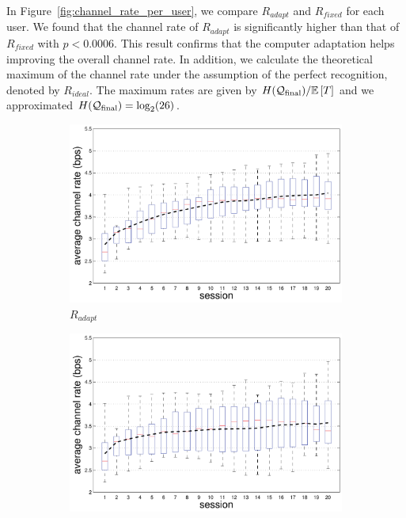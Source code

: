 \documentclass{sigchi}
\begin{document}
In Figure~\ref{fig:channel_rate_per_user}, we compare $R_{adapt}$ and
$R_{fixed}$ for each user. We found that the channel rate of
$R_{adapt}$ is significantly higher than that of $R_{fixed}$ with $p <
0.0006$.  This result confirms that the computer adaptation helps
improving the overall channel rate. In addition, we calculate the
theoretical maximum of the channel rate under the assumption of the
perfect recognition, denoted by $R_{ideal}$. The maximum rates are
given by $H(\mathcal{Q}_{\mathrm{final}}) / \mathbb{E} \left[T\right]$ and we approximated $H(\mathcal{Q}_{\mathrm{final}}) =
\log_2(26)$.

\begin{figure}
  \centering
  \begin{subfigure}[b]{\columnwidth}
    \includegraphics[width=\columnwidth]{figures/IUI_BPS_p_adapt.pdf}
    \caption{$R_{adapt}$}
    \label{fig:channel_rate_adapt}
  \end{subfigure}
  \begin{subfigure}[b]{\columnwidth}
    \includegraphics[width=\columnwidth]{figures/IUI_BPS_p_first.pdf}

\end{subfigure}
\end{figure}
\end{document}
